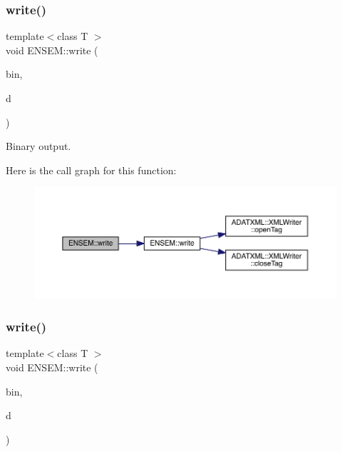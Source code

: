 \subsubsection{\texorpdfstring{write()}{write()}\hspace{0.1cm}{\footnotesize\ttfamily [6/13]}}
{\footnotesize\ttfamily template$<$class T $>$ \\
void E\+N\+S\+E\+M\+::write (\begin{DoxyParamCaption}\item[{\mbox{\hyperlink{classADATIO_1_1BinaryWriter}{A\+D\+A\+T\+I\+O\+::\+Binary\+Writer}} \&}]{bin,  }\item[{const \mbox{\hyperlink{classENSEM_1_1EScalar}{E\+Scalar}}$<$ \mbox{\hyperlink{classENSEM_1_1OScalar}{O\+Scalar}}$<$ T $>$ $>$ \&}]{d }\end{DoxyParamCaption})\hspace{0.3cm}{\ttfamily [inline]}}



Binary output. 

Here is the call graph for this function\+:\nopagebreak
\begin{figure}[H]
\begin{center}
\leavevmode
\includegraphics[width=350pt]{d2/d94/namespaceENSEM_a0cbc421b6e399674cc0f2faf6ca73e9e_cgraph}
\end{center}
\end{figure}
\mbox{\label{namespaceENSEM_a50d31b905b65f0286fa9c7204b5a6b19}} 
\subsubsection{\texorpdfstring{write()}{write()}\hspace{0.1cm}{\footnotesize\ttfamily [7/13]}}
{\footnotesize\ttfamily template$<$class T $>$ \\
void E\+N\+S\+E\+M\+::write (\begin{DoxyParamCaption}\item[{\mbox{\hyperlink{classADATIO_1_1BinaryWriter}{A\+D\+A\+T\+I\+O\+::\+Binary\+Writer}} \&}]{bin,  }\item[{const \mbox{\hyperlink{classENSEM_1_1EScalar}{E\+Scalar}}$<$ \mbox{\hyperlink{classENSEM_1_1OVector}{O\+Vector}}$<$ T $>$ $>$ \&}]{d }\end{DoxyParamCaption})\hspace{0.3cm}{\ttfamily [inline]}}



